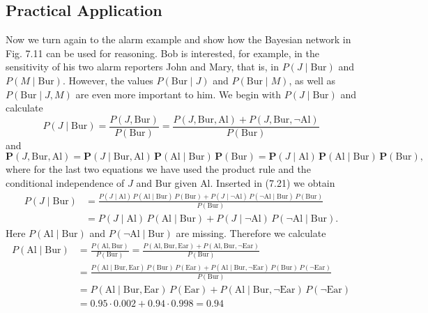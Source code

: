 \documentclass[10pt]{book}
\begin{document}
\subsection{Practical Application}
Now we turn again to the alarm example and show how the Bayesian network in Fig. 7.11 can be used for reasoning. Bob is interested, for example, in the sensitivity of his two alarm reporters John and Mary, that is, in $P(J \mid \text{Bur})$ and $P(M \mid \text{Bur})$. However, the values $P(\text{Bur} \mid J)$ and $P(\text{Bur} \mid M)$, as well as $P(\text{Bur} \mid J, M)$ are even more important to him. We begin with $P(J \mid \text{Bur})$ and calculate
\begin{equation*}
P(J \mid \text{Bur})=\frac{P(J,\text{Bur})}{P(\text{Bur})}=\frac{P(J,\text{Bur},\text{Al})+P(J,\text{Bur},\neg \text{Al})}{P(\text{Bur})} \tag{7.21}
\end{equation*}
and
\begin{equation*}
\boldsymbol{P}(J,\text{Bur},\text{Al})=\boldsymbol{P}(J \mid \text{Bur},\text{Al})\,\boldsymbol{P}(\text{Al} \mid \text{Bur})\,\boldsymbol{P}(\text{Bur})=\boldsymbol{P}(J \mid \text{Al})\,\boldsymbol{P}(\text{Al} \mid \text{Bur})\,\boldsymbol{P}(\text{Bur}), \tag{7.22}
\end{equation*}
where for the last two equations we have used the product rule and the conditional independence of $J$ and $\text{Bur}$ given $\text{Al}$. Inserted in (7.21) we obtain
\begin{align*}
P(J \mid \text{Bur}) & =\frac{P(J \mid \text{Al})\,P(\text{Al} \mid \text{Bur})\,P(\text{Bur})+P(J \mid \neg \text{Al})\,P(\neg \text{Al} \mid \text{Bur})\,P(\text{Bur})}{P(\text{Bur})}  \tag{7.23}\\
& =P(J \mid \text{Al})\,P(\text{Al} \mid \text{Bur})+P(J \mid \neg \text{Al})\,P(\neg \text{Al} \mid \text{Bur}) .
\end{align*}
Here $P(\text{Al} \mid \text{Bur})$ and $P(\neg \text{Al} \mid \text{Bur})$ are missing. Therefore we calculate
$$
\begin{aligned}
P(\text{Al} \mid \text{Bur}) & =\frac{P(\text{Al},\text{Bur})}{P(\text{Bur})}=\frac{P(\text{Al},\text{Bur},\text{Ear})+P(\text{Al},\text{Bur},\neg \text{Ear})}{P(\text{Bur})} \\
& =\frac{P(\text{Al} \mid \text{Bur},\text{Ear})\,P(\text{Bur})\,P(\text{Ear})+P(\text{Al} \mid \text{Bur},\neg \text{Ear})\,P(\text{Bur})\,P(\neg \text{Ear})}{P(\text{Bur})} \\
& =P(\text{Al} \mid \text{Bur},\text{Ear})\,P(\text{Ear})+P(\text{Al} \mid \text{Bur},\neg \text{Ear})\,P(\neg \text{Ear}) \\
& =0.95 \cdot 0.002+0.94 \cdot 0.998=0.94
\end{aligned}
$$
\end{document}
